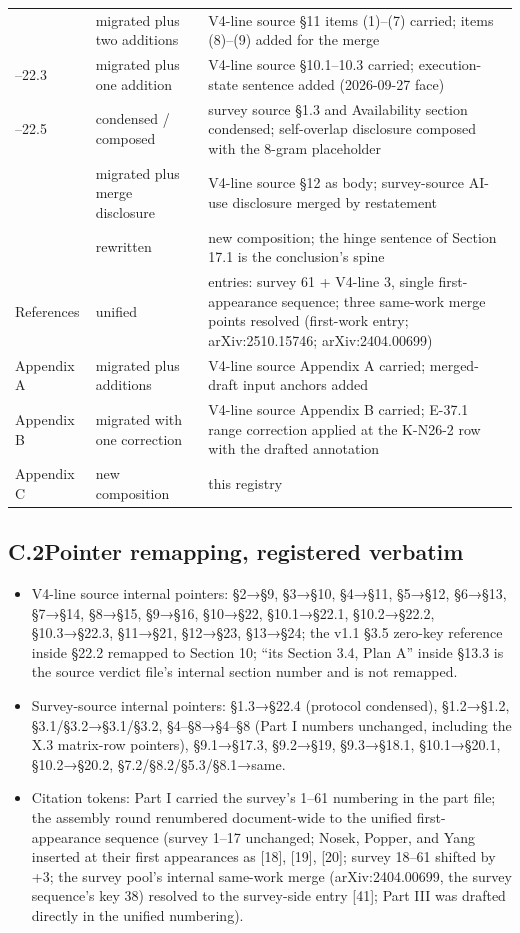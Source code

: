 \documentclass[11pt]{article}
\begin{document}
\begin{longtable}{@{}>{\raggedright\arraybackslash}p{} p{} >{\raggedright\arraybackslash}p{}@{}}
21 & migrated plus two additions & V4-line source §11 items (1)–(7) carried; items (8)–(9) added for the merge \\
22.1–22.3 & migrated plus one addition & V4-line source §10.1–10.3 carried; execution-state sentence added (2026-09-27 face) \\
22.4–22.5 & condensed / composed & survey source §1.3 and Availability section condensed; self-overlap disclosure composed with the 8-gram placeholder \\
23 & migrated plus merge disclosure & V4-line source §12 as body; survey-source AI-use disclosure merged by restatement \\
24 & rewritten & new composition; the hinge sentence of Section 17.1 is the conclusion's spine \\
References & unified & 64 entries: survey 61 + V4-line 3, single first-appearance sequence; three same-work merge points resolved (first-work entry; arXiv:2510.15746; arXiv:2404.00699) \\
Appendix A & migrated plus additions & V4-line source Appendix A carried; merged-draft input anchors added \\
Appendix B & migrated with one correction & V4-line source Appendix B carried; E-37.1 range correction applied at the K-N26-2 row with the drafted annotation \\
Appendix C & new composition & this registry \\
\bottomrule
\end{longtable}
\endgroup
\subsection*{C.2\quad Pointer remapping, registered verbatim}
\begin{itemize}[leftmargin=1.6em,itemsep=2pt,parsep=0pt,topsep=3pt]
\item V4-line source internal pointers: §2→§9, §3→§10, §4→§11, §5→§12, §6→§13, §7→§14, §8→§15, §9→§16, §10→§22, §10.1→§22.1, §10.2→§22.2, §10.3→§22.3, §11→§21, §12→§23, §13→§24; the v1.1 §3.5 zero-key reference inside §22.2 remapped to Section 10; ``its Section 3.4, Plan A'' inside §13.3 is the source verdict file's internal section number and is not remapped.
\item Survey-source internal pointers: §1.3→§22.4 (protocol condensed), §1.2→§1.2, §3.1/§3.2→§3.1/§3.2, §4–§8→§4–§8 (Part I numbers unchanged, including the X.3 matrix-row pointers), §9.1→§17.3, §9.2→§19, §9.3→§18.1, §10.1→§20.1, §10.2→§20.2, §7.2/§8.2/§5.3/§8.1→same.
\item Citation tokens: Part I carried the survey's 1–61 numbering in the part file; the assembly round renumbered document-wide to the unified first-appearance sequence (survey 1–17 unchanged; Nosek, Popper, and Yang inserted at their first appearances as [18], [19], [20]; survey 18–61 shifted by +3; the survey pool's internal same-work merge (arXiv:2404.00699, the survey sequence's key 38) resolved to the survey-side entry [41]; Part III was drafted directly in the unified numbering).
\end{itemize}
\end{document}
